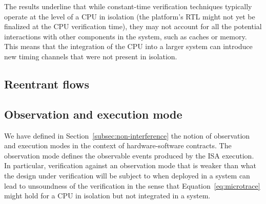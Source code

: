 The results underline that while constant-time verification techniques typically operate at the level of a CPU in isolation (the platform's RTL might not yet be finalized at the CPU verification time), they may not account for all the potential interactions with other components in the system, such as caches or memory.
This means that the integration of the CPU into a larger system can introduce new timing channels that were not present in isolation.

\subsection{Reentrant flows}




\subsection{Observation and execution mode}
\label{subsec:observation_mode}

We have defined in Section~\ref{subsec:non-interference} the notion of observation and execution modes in the context of hardware-software contracts.
The observation mode defines the observable events produced by the ISA execution.
In particular, verification against an observation mode that is weaker than what the design under verification will be subject to when deployed in a system can lead to unsoundness of the verification in the sense that Equation~\ref{eq:microtrace} might hold for a CPU in isolation but not integrated in a system.

